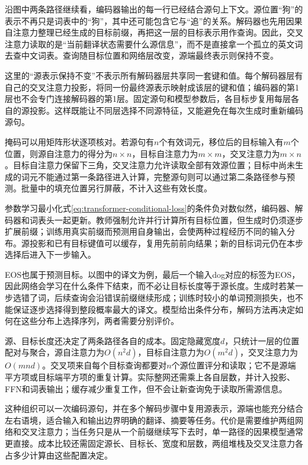 沿图中两条路径继续看，编码器输出的每一行已经结合源句上下文。源位置“狗”的表示不再只是词表中的“狗”，其中还可能包含它与“追”的关系。解码器也先用因果自注意力整理已经生成的目标前缀，再把这一层的目标表示用作查询。因此，交叉注意力读取的是“当前翻译状态需要什么源信息”，而不是直接拿一个孤立的英文词去查中文词表。查询随目标位置和网络层改变，源端最终表示则保持不变。

这里的“源表示保持不变”不表示所有解码器层共享同一套键和值。每个解码器层有自己的交叉注意力投影，将同一份最终源表示映射成该层的键和值；编码器的第1层也不会专门连接解码器的第1层。固定源句和模型参数后，各目标步复用每层各自的源投影。这样既能让不同层选择不同源特征，又能避免在每次生成时重新编码源句。

掩码可以用矩阵形状逐项核对。若源句有$n$个有效词元，移位后的目标输入有$m$个位置，则源自注意力的得分为$n\times n$，目标自注意力为$m\times m$，交叉注意力为$m\times n$。目标自注意力保留下三角，交叉注意力允许读取全部有效源位置；目标中尚未生成的词元不能通过第一条路径进入计算，完整源句则可以通过第二条路径参与预测。批量中的填充位置另行屏蔽，不计入这些有效长度。

参数学习最小化式\eqref{eq:transformer-conditional-loss}的条件负对数似然，编码器、解码器和词表头一起更新。教师强制允许并行计算所有目标位置，但生成时仍须逐步扩展前缀；训练用真实前缀而预测用自身输出，会使两种过程经历不同的输入分布。源投影和已有目标键值可以缓存，复用先前前向结果；新的目标词元仍在本步选择后进入下一步输入。

EOS也属于预测目标。以图中的译文为例，最后一个输入dog对应的标签为EOS，因此网络会学习在什么条件下结束，而不必让目标长度等于源长度。生成时若某一步选错了词，后续查询会沿错误前缀继续形成；训练时较小的单词预测损失，也不能保证逐步选择得到整段概率最大的译文。模型给出条件分布，解码方法再决定如何在这些分布上选择序列，两者需要分别评价。

源、目标长度还决定了两条路径各自的成本。固定隐藏宽度$d$，只统计一层的位置配对与聚合，源自注意力为$O(n^2d)$，目标自注意力为$O(m^2d)$，交叉注意力为$O(mnd)$。交叉项来自每个目标查询都要对$n$个源位置评分和读取；它不是源端平方项或目标端平方项的重复计算。实际整网还需乘上各自层数，并计入投影、FFN和词表输出；缓存减少重复工作，但不会让新查询免于读取所需源信息。

这种组织可以一次编码源句，并在多个解码步骤中复用源表示，源端也能充分结合左右语境，适合输入和输出边界明确的翻译、摘要等任务。代价是需要维护两组网络和交叉注意力；当任务只是从一个前缀继续写下去时，单一路径的因果模型通常更直接。成本比较还需固定源长、目标长、宽度和层数，两组堆栈及交叉注意力各占多少计算由这些配置决定。



